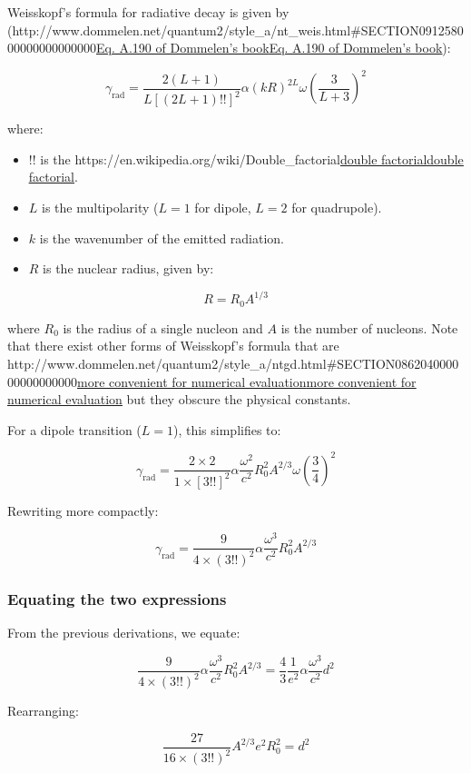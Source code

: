 \documentclass[
]{article}
\let\oldhref\href
\renewcommand{\href}[2]{\ifx#1\urlprefix\oldhref{#1}{#2}\else\uline{\oldhref{#1}{#2}}\fi}
\renewcommand{\[}{\begin{equation}}
\renewcommand{\]}{\end{equation}}
\providecommand{\tightlist}{%
  \setlength{\itemsep}{0pt}\setlength{\parskip}{0pt}}
\begin{document}
Weisskopf's formula for radiative decay is given by
(\href{http://www.dommelen.net/quantum2/style_a/nt_weis.html\#SECTION091258000000000000000}{Eq.
A.190 of Dommelen's book}):

\[
\gamma_{\text{rad}} = \frac{2 (L+1)}{L \left[(2L+1)!!\right]^2} \alpha (kR)^{2L} \omega \left( \frac{3}{L+3} \right)^2
\]

where:

\begin{itemize}
\tightlist
\item
  \(!!\) is the
  \href{https://en.wikipedia.org/wiki/Double_factorial}{double
  factorial}.
\item
  \(L\) is the multipolarity (\(L=1\) for dipole, \(L=2\) for
  quadrupole).
\item
  \(k\) is the wavenumber of the emitted radiation.
\item
  \(R\) is the nuclear radius, given by:
\end{itemize}

\[
R = R_0 A^{1/3}
\]

where \(R_0\) is the radius of a single nucleon and \(A\) is the number
of nucleons. Note that there exist other forms of Weisskopf's formula
that are
\href{http://www.dommelen.net/quantum2/style_a/ntgd.html\#SECTION086204000000000000000}{more
convenient for numerical evaluation} but they obscure the physical
constants.

For a dipole transition (\(L=1\)), this simplifies to:

\[
\gamma_{\text{rad}} = \frac{2 \times 2}{1 \times [3!!]^2} \alpha \frac{\omega^2}{c^2} R_0^2 A^{2/3} \omega \left(\frac{3}{4} \right)^2
\]

Rewriting more compactly:

\[
\gamma_{\text{rad}} = \frac{9}{4\times(3!!)^2} \alpha \frac{\omega^3}{c^2} R_0^2 A^{2/3}
\]

\subsubsection{Equating the two
expressions}\label{equating-the-two-expressions}

From the previous derivations, we equate:

\[
\frac{9}{4\times(3!!)^2} \alpha \frac{\omega^3}{c^2} R_0^2 A^{2/3} = \frac{4}{3} \frac{1}{e^2} \alpha \frac{\omega^3}{c^2} d^2
\]

Rearranging:

\[
\frac{27}{16 \times (3!!)^2} A^{2/3} e^2 R_0^2 = d^2
\]
\end{document}
